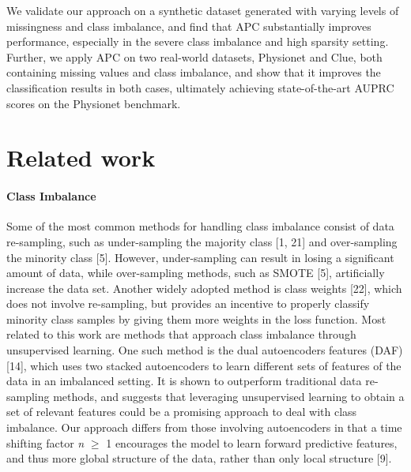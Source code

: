 \documentclass{article}
\begin{document}
We validate our approach on a synthetic dataset generated with varying levels of missingness and class imbalance, and find that APC substantially improves performance, especially in the severe class imbalance and high sparsity setting.
Further, we apply APC on two real-world datasets, Physionet and Clue, both containing missing values and class imbalance, and show that it improves the classification results in both cases, ultimately achieving  state-of-the-art AUPRC scores on the Physionet benchmark.


\section{Related work}
\paragraph{Class Imbalance}

Some of the most common methods for handling class imbalance consist of data re-sampling, such as under-sampling the majority class [1, 21]
and over-sampling the minority class [5].
However, under-sampling can result in losing a significant amount of data, 
while over-sampling methods, such as SMOTE [5],
artificially increase the data set.
Another widely adopted method is class weights [22],
which does not involve re-sampling, but provides an incentive to properly classify minority class samples by giving them more weights in the loss function. Most related to this work are methods that approach class imbalance through unsupervised learning. One such method is the dual autoencoders features (DAF) [14], which 
uses two stacked autoencoders to learn different sets of features of the data in an imbalanced setting. 
It is shown to outperform traditional data re-sampling methods, and suggests that leveraging unsupervised learning to obtain a set of relevant features could be a promising approach to deal with class imbalance. 
Our approach differs from those involving autoencoders in that a time shifting factor \textit{n} $\geq$ 1 encourages the  model to learn forward predictive features, and thus more global structure of the data, rather than only local structure [9]. 
\end{document}
